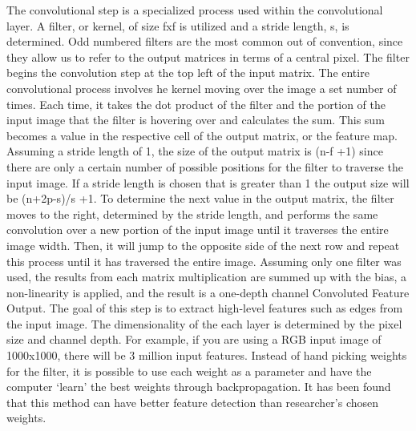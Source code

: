\documentclass[10pt,twocolumn]{article}
\begin{document}
The convolutional step is a specialized process used within the convolutional layer. A filter, or kernel, of size fxf is utilized and a stride length, s, is determined. Odd numbered filters are the most common out of convention, since they allow us to refer to the output matrices in terms of a central pixel. The filter begins the convolution step at the top left of the input matrix. The entire convolutional process involves he kernel moving over the image a set number of times. Each time, it takes the dot product of the filter and the portion of the input image that the filter is hovering over and calculates the sum. This sum becomes a value in the respective cell of the output matrix, or the feature map. Assuming a stride length of 1, the size of the output matrix is (n-f +1) since there are only a certain number of possible positions for the filter to traverse the input image. If a stride length is chosen that is greater than 1 the output size will be (n+2p-s)/s +1. To determine the next value in the output matrix, the filter moves to the right, determined by the stride length, and performs the same convolution over a new portion of the input image until it traverses the entire image width. Then, it will jump to the opposite side of the next row and repeat this process until it has traversed the entire image. Assuming only one filter was used, the results from each matrix multiplication are summed up with the bias, a non-linearity is applied, and the result is a one-depth channel Convoluted Feature Output. The goal of this step is to extract high-level features such as edges from the input image. The dimensionality of the each layer is determined by the pixel size and channel depth. For example, if you are using a RGB input image of 1000x1000, there will be 3 million input features. Instead of hand picking weights for the filter, it is possible to use each weight as a parameter and have the computer ‘learn’ the best weights through backpropagation. It has been found that this method can have better feature detection than researcher’s chosen weights. 
\end{document}
